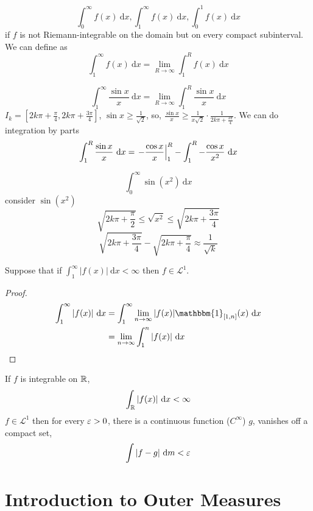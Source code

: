 \begin{definition}
  \[\int_0^\infty f(x)\ \mathrm{d}x, \int_1^\infty f(x)\ \mathrm{d}x, \int_0^1 f(x)\ \mathrm{d}x\]
  if $f$ is not Riemann-integrable on the domain but on every compact subinterval.
  We can define as
  \[\int_1^\infty f(x)\ \mathrm{d}x = \lim_{R\to\infty}\int_1^Rf(x) \ \mathrm{d}x\]

\end{definition}
\begin{example}
  \[\int_1^\infty \frac{\sin x}{x}\ \mathrm{d}x = \lim_{R\to\infty}\int_1^R\frac{\sin x}x \ \mathrm{d}x\]
  $I_k = [2k\pi + \frac\pi4, 2k\pi + \frac{3\pi}4]$, $\sin x \ge \frac1{\sqrt2}$, so, $\frac{\sin x}{x} \ge \frac1{x\sqrt2}\cdot \frac{1}{2k\pi + \frac{3\pi}4}$.
  We can do integration by parts
  $$
    \int_1^R \frac{\sin x}x \ \mathrm{d}x = \left.-\frac{\cos x}x\right|_1^R - \int_1^R -\frac{\cos x}{x^2} \ \mathrm{d}x \\
  $$
\end{example}

\begin{example}
  \[\int_0^\infty \sin(x^2)\ \mathrm{d}x\]
  consider $\sin(x^2)$
  \[
    \sqrt{2k\pi + \frac\pi2} \le \sqrt{x^2} \le \sqrt{2k\pi + \frac{3\pi}4} 
  \]
  \[\sqrt{2k\pi + \frac{3\pi}4} - \sqrt{2k\pi + \frac{\pi}4} \approx \frac1{\sqrt{k}}\]
\end{example}

\begin{lemma}
  Suppose that if $\int_1^\infty |f(x)|\ \mathrm{d}x < \infty$ then $f\in \mathcal{L}^1$.
\end{lemma}
\begin{proof}
  \begin{align*}
    \int_1^\infty |f(x)|\ \mathrm{d}x &= \int_1^\infty \lim_{n\to\infty}|f(x)|\mathbbm{1}_{[1, n]}(x)\ \mathrm{d}x \\
    &= \lim_{n\to\infty}\int_1^n |f(x)|\ \mathrm{d}x
  \end{align*}
\end{proof}

\begin{theorem}
  If $f$ is integrable on $\mathbb R$, $$\int_\mathbb R |f(x)|\ \mathrm{d}x < \infty$$ $f \in \mathcal{L}^1$ 
  then for every $\varepsilon > 0$, there is a continuous function ($C^\infty$) $g$, vanishes off a compact set, 
  \[\int |f - g| \ \mathrm{d}m < \eps\]
\end{theorem}

\section{Introduction to Outer Measures}

